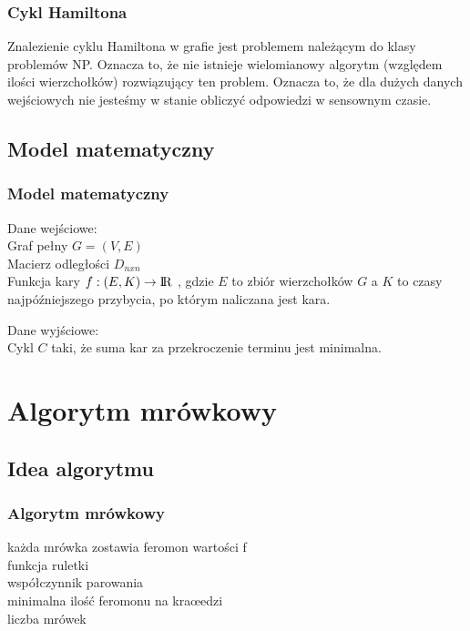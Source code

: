 \documentclass{beamer}
\begin{document}
\begin{frame}
\frametitle{Cykl Hamiltona}
Znalezienie cyklu Hamiltona w grafie jest problemem należącym do klasy problemów NP.
Oznacza to, że nie istnieje wielomianowy algorytm (względem ilości wierzchołków) rozwiązujący ten problem. Oznacza to, że dla dużych danych wejściowych nie jesteśmy w stanie obliczyć odpowiedzi w sensownym czasie.
\end{frame}

\subsection{Model matematyczny}
\begin{frame}
\frametitle{Model matematyczny}
Dane wejściowe: \\
Graf pełny $G=(V,E)$  \\
Macierz odległości $D_{nxn}$ \\
Funkcja kary $ f : (E,K) \rightarrow {\rm I\!R} $ , gdzie $E$ to zbiór wierzchołków $G$ a $K$ to czasy najpóźniejszego przybycia, po którym naliczana jest kara.

Dane wyjściowe: \\
Cykl $C$ taki, że suma kar za przekroczenie terminu jest minimalna.
\end{frame}





\section{Algorytm mrówkowy}

\subsection{Idea algorytmu}

\begin{frame}
\frametitle{Algorytm mrówkowy}
każda mrówka zostawia feromon wartości f \\
funkcja ruletki \\
współczynnik parowania \\
minimalna ilość feromonu na kraœedzi \\
liczba mrówek \\
\end{frame}
\end{document}
